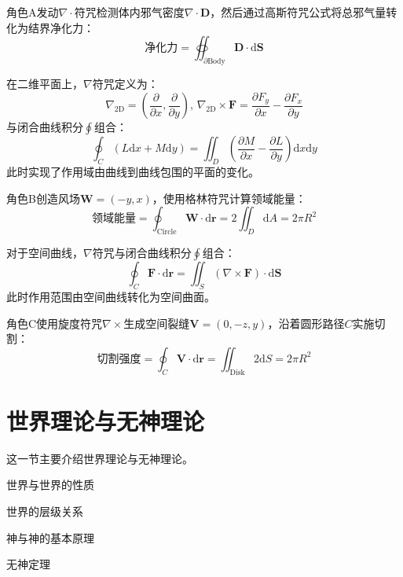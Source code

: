 \documentclass[lang=cn,newtx,10pt,scheme=chinese]{elegantbook}
\begin{document}
\begin{example}[净化结界展开]
    角色A发动$\nabla\cdot$符咒检测体内邪气密度$\nabla\cdot\bm{D}$，然后通过高斯符咒公式将总邪气量转化为结界净化力：
    \[
        \text{净化力} = \oiint_{\partial \text{Body}} \bm{D}\cdot\mathrm{d}\bm{S}
    \]
\end{example}

\begin{theorem}[格林符咒公式]
    在二维平面上，$\nabla$符咒定义为：
    \[
        \nabla_{\text{2D}} = \left(\frac{\partial}{\partial x}, \frac{\partial}{\partial y}\right),\,
        \nabla_{\text{2D}}\times \bm{F}=\frac{\partial F_y}{\partial x} - \frac{\partial F_x}{\partial y}
    \]
    与闭合曲线积分$\oint$组合：
    \[
        \oint_C (L\mathrm{d}x + M\mathrm{d}y) = \iint_D \left(\frac{\partial M}{\partial x} - \frac{\partial L}{\partial y}\right) \mathrm{d}x\mathrm{d}y
    \]
    此时实现了作用域由曲线到曲线包围的平面的变化。
\end{theorem}

\begin{example}[风之领域]
    角色B创造风场$\bm{W} = (-y,x)$，使用格林符咒计算领域能量：
    \[
        \text{领域能量} = \oint_{\text{Circle}} \bm{W}\cdot\mathrm{d}\bm{r} = 2\iint_{D} \mathrm{d}A = 2\pi R^2
    \]
\end{example}

\begin{theorem}[斯托克斯符咒公式]
    对于空间曲线，$\nabla$符咒与闭合曲线积分$\oint$组合：
    \[
        \oint_C \bm{F}\cdot\mathrm{d}\bm{r} = \iint_S (\nabla\times\bm{F})\cdot\mathrm{d}\bm{S}
    \]
    此时作用范围由空间曲线转化为空间曲面。
\end{theorem}

\begin{example}[空间切割]
    角色C使用旋度符咒$\nabla\times$生成空间裂缝$\bm{V} = (0,-z,y)$，沿着圆形路径$C$实施切割：
    \[
        \text{切割强度} = \oint_C \bm{V}\cdot\mathrm{d}\bm{r} = \iint_{\text{Disk}} 2\mathrm{d}S = 2\pi R^2
    \]
\end{example}


\section{世界理论与无神理论}
这一节主要介绍世界理论与无神理论。
\begin{introduction}
    \item 世界与世界的性质
    \item 世界的层级关系
    \item 神与神的基本原理
    \item 无神定理
\end{introduction}
\end{document}
